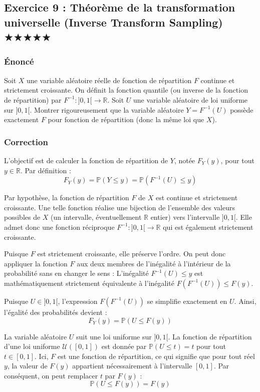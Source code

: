 \documentclass[11pt,a4paper]{article}
\begin{document}
\subsection*{Exercice 9 : Théorème de la transformation universelle (Inverse Transform Sampling) \quad $\bigstar\bigstar\bigstar\bigstar\bigstar$}

\subsubsection*{Énoncé}

Soit $X$ une variable aléatoire réelle de fonction de répartition $F$ continue et strictement croissante.
On définit la fonction quantile (ou inverse de la fonction de répartition) par $F^{-1} : ]0, 1[ \to \mathbb{R}$.
Soit $U$ une variable aléatoire de loi uniforme sur $]0, 1[$.
Montrer rigoureusement que la variable aléatoire $Y = F^{-1}(U)$ possède exactement $F$ pour fonction de répartition (donc la même loi que $X$).

\subsubsection*{Correction}

L'objectif est de calculer la fonction de répartition de $Y$, notée $F_Y(y)$, pour tout $y \in \mathbb{R}$.
Par définition :
$$ F_Y(y) = \mathbb{P}(Y \leq y) = \mathbb{P}(F^{-1}(U) \leq y) $$

Par hypothèse, la fonction de répartition $F$ de $X$ est continue et strictement croissante. Une telle fonction réalise une bijection de l'ensemble des valeurs possibles de $X$ (un intervalle, éventuellement $\mathbb{R}$ entier) vers l'intervalle $]0, 1[$.
Elle admet donc une fonction réciproque $F^{-1} : ]0, 1[ \to \mathbb{R}$ qui est également strictement croissante.

Puisque $F$ est strictement croissante, elle préserve l'ordre. On peut donc appliquer la fonction $F$ aux deux membres de l'inégalité à l'intérieur de la probabilité sans en changer le sens :
L'inégalité $F^{-1}(U) \leq y$ est mathématiquement strictement équivalente à l'inégalité $F(F^{-1}(U)) \leq F(y)$.

Puisque $U \in ]0, 1[$, l'expression $F(F^{-1}(U))$ se simplifie exactement en $U$.
Ainsi, l'égalité des probabilités devient :
$$ F_Y(y) = \mathbb{P}(U \leq F(y)) $$

La variable aléatoire $U$ suit une loi uniforme sur $]0, 1[$. La fonction de répartition d'une loi uniforme $\mathcal{U}([0,1])$ est donnée par $\mathbb{P}(U \leq t) = t$ pour tout $t \in [0, 1]$.
Ici, $F$ est une fonction de répartition, ce qui signifie que pour tout réel $y$, la valeur de $F(y)$ appartient nécessairement à l'intervalle $[0, 1]$.
Par conséquent, on peut remplacer $t$ par $F(y)$ :
$$ \mathbb{P}(U \leq F(y)) = F(y) $$
\end{document}
